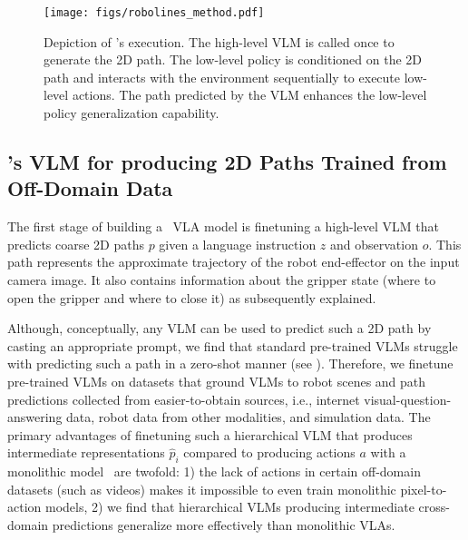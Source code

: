 \begin{figure*}[!t]
    \centering
    \texttt{[image: figs/robolines\_method.pdf]}
    \caption{\footnotesize{Depiction of \method 's execution. The high-level VLM is called once to generate the 2D path. The low-level policy is conditioned on the 2D path and interacts with the environment sequentially to execute low-level actions. The path predicted by the VLM enhances the low-level policy generalization capability.}
    }
    \vspace{-4mm}
    \label{fig:method}
\end{figure*}

\subsection{\method 's VLM for producing 2D Paths Trained from Off-Domain Data}
\label{sec:method:vlm}

The first stage of building a \method\ VLA model is finetuning a high-level VLM that predicts coarse 2D paths $p$ given a language instruction $z$ and observation $o$. This path represents the approximate trajectory of the robot end-effector on the input camera image. It also contains information about the gripper state (where to open the gripper and where to close it) as subsequently explained.

Although, conceptually, any VLM can be used to predict such a 2D path by casting an appropriate prompt, we find that standard pre-trained VLMs struggle with predicting such a path in a zero-shot manner (see ). Therefore, we finetune pre-trained VLMs on datasets that ground VLMs to robot scenes and path predictions collected from easier-to-obtain sources, i.e., internet visual-question-answering data, robot data from other modalities, and simulation data.
The primary advantages of finetuning such a hierarchical VLM that produces intermediate representations $\hat{p}_i$ compared to producing actions $a$ with a monolithic model~\citep{kim2024openvla, zitkovich2023rt} are twofold: 1) the lack of actions in certain off-domain datasets (such as videos) makes it impossible to even train monolithic pixel-to-action models, 2) we find that hierarchical VLMs producing intermediate cross-domain predictions generalize more effectively than monolithic VLAs. 

